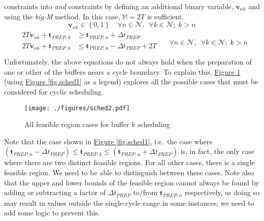 constraints into \emph{and} constraints by defining an additional binary
variable, $\boldsymbol{v}_{nk}$ and using the \emph{big-M} method. In this
case, $\mathbb{M} = 2T$ is sufficient.
\begin{equation}
    \boldsymbol{v}_{nk} \in \left\{ 0, 1 \right\} \quad \forall n \in 
    \mathcal{N}, \enspace \forall k \in \mathcal{N}; \; k > n
    \label{eq.v}
\end{equation}
\begin{equation}
    \begin{split}
        \begin{alignedat}{2}
            2T \boldsymbol{v}_{nk} + \boldsymbol{t}_{\mathit{PREP},k} &{}\ge{}
            \boldsymbol{t}_{\mathit{PREP},n} {}+{} \Delta t_{\mathit{PREP}}\\
            2T \boldsymbol{v}_{nk} + \boldsymbol{t}_{\mathit{PREP},k} &{}\le{}
            \boldsymbol{t}_{\mathit{PREP},n} {}-{} \Delta t_{\mathit{PREP}}
            {}+{} 2T\\
        \end{alignedat}
    \end{split}
    \quad \forall n \in \mathcal{N}, \enspace \forall k \in \mathcal{N}; \;
    k > n
    \label{eq.k1}
\end{equation}
Unfortunately, the above equations do not always hold when the preparation of
one or other of the buffers nears a cycle boundary.
To explain this, \hyperref[fig.sched2]{Figure \ref*{fig.sched2}} (using
\hyperref[fig.sched1]{Figure \ref*{fig.sched1}} as a legend) explores all the
possible cases that must be considered for cyclic scheduling.
\begin{figure}
    \centering
    \texttt{[image: ./figures/sched2.pdf]}
    \caption{All feasible region cases for buffer $k$ scheduling}
    \label{fig.sched2}
\end{figure}
Note that the case shown in \hyperref[fig.sched1]{Figure \ref*{fig.sched1}}, 
i.e.\ the case where
$\left( \boldsymbol{t}_{\mathit{PREP},n} - \Delta t_{\mathit{PREP}} \right) \le 
 \boldsymbol{t}_{\mathit{PREP},k} \le
 \left( \boldsymbol{t}_{\mathit{PREP},n} + \Delta t_{\mathit{PREP}} \right)$
is, in fact, the only case where there are two distinct feasible regions.
For all other cases, there is a single feasible region.  We need to be able to
distinguish between these cases.
Note also that the upper and lower bounds of the feasible region cannot always
be found by adding or subtracting a factor of $\Delta t_{\mathit{PREP}}$
to/from $\boldsymbol{t}_{\mathit{PREP},n}$ respectively, as doing so may result
in values outside the single-cycle range in some instances; we need to add some
logic to prevent this.

